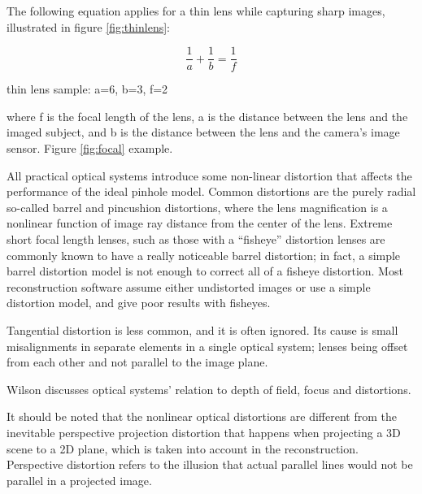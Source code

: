 The following equation applies for a thin lens while capturing sharp images, illustrated in figure \ref{fig:thinlens}:

\begin{equation}
	\frac{1}{a} + \frac{1}{b} = \frac{1}{f} \label{eq:focal}
\end{equation}

{ thin lens sample: a=6, b=3, f=2 }

where f is the focal length of the lens, a is the distance between the lens and the imaged subject, and b is the distance between the lens and the camera's image sensor. Figure \ref{fig:focal} example.


All practical optical systems introduce some non-linear distortion that affects the performance of the ideal pinhole model.
Common distortions are the purely radial so-called barrel and pincushion distortions, where the lens magnification is a nonlinear function of image ray distance from the center of the lens. %
\cite{brown1966decentering}
Extreme short focal length lenses, such as those with a ``fisheye'' distortion lenses are commonly known to have a really noticeable barrel distortion; in fact, a simple barrel distortion model is not enough to correct all of a fisheye distortion.
Most reconstruction software assume either undistorted images or use a simple distortion model, and give poor results with fisheyes.

Tangential distortion is less common, and it is often ignored. Its cause is small misalignments in separate elements in a single optical system; lenses being offset from each other and not parallel to the image plane. \cite{kingslake1989history}

Wilson \cite{wilson2004anton} discusses optical systems' relation to depth of field, focus and distortions.

It should be noted that the nonlinear optical distortions are different from the inevitable perspective projection distortion that happens when projecting a 3D scene to a 2D plane, which is taken into account in the reconstruction.
Perspective distortion refers to the illusion that actual parallel lines would not be parallel in a projected image. \cite{SOMEONE}

